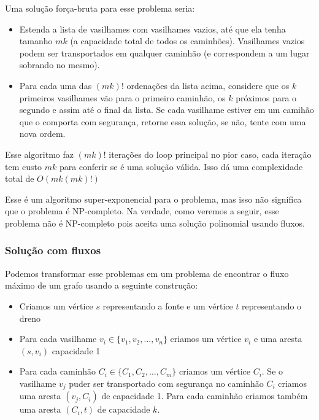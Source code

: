 \documentclass[11pt]{article}
\begin{document}
Uma solução força-bruta para esse problema seria:

\begin{itemize}
\item Estenda a lista de vasilhames com vasilhames vazios, até que ela
tenha tamanho $mk$ (a capacidade total de todos os
caminhões). Vasilhames vazios podem ser transportados em qualquer
caminhão (e correspondem a um lugar sobrando no mesmo).
\item Para cada uma das $(mk)!$ ordenações da lista acima, considere que
os $k$ primeiros vasilhames vão para o primeiro caminhão, os $k$
próximos para o segundo e assim até o final da lista. Se cada
vasilhame estiver em um camihão que o comporta com segurança,
retorne essa solução, se não, tente com uma nova ordem.
\end{itemize}

Esse algoritmo faz $(mk)!$ iterações do loop principal no pior caso, cada
iteração tem custo $mk$ para conferir se é uma solução válida. Isso dá
uma complexidade total de $O(mk(mk)!)$

Esse é um algoritmo super-exponencial para o problema, mas isso não
significa que o problema é NP-completo. Na verdade, como veremos a
seguir, esse problema não é NP-completo pois aceita uma solução
polinomial usando fluxos.

\subsubsection{Solução com fluxos}
\label{sec-6-2-1}

Podemos transformar esse problemas em um problema de encontrar o fluxo
máximo de um grafo usando a seguinte construção:

\begin{itemize}
\item Criamos um vértice $s$ representando a fonte e um vértice $t$
  representando o dreno

\item Para cada vasilhame $v_i \in \{v_1, v_2, \ldots, v_n\}$ criamos um
vértice $v_i$ e uma aresta $(s, v_i)$ capacidade 1

\item Para cada caminhão $C_i \in \{C_1, C_2, \ldots, C_m\}$ criamos um
vértice $C_i$. Se o vasilhame $v_j$ puder ser transportado com
segurança no caminhão $C_i$ criamos uma aresta $(v_j, C_i)$ de
capacidade 1. Para cada caminhão criamos também uma aresta $(C_i, t)$
de capacidade $k$.
\end{itemize}
\end{document}
